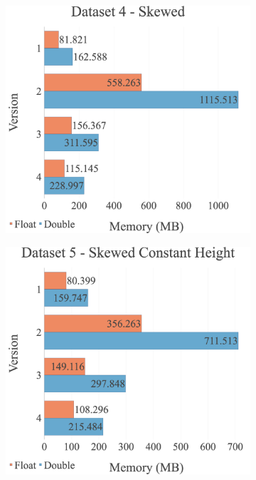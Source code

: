 \begin{figure}[H]
\begin{adjustwidth}{-2cm}{-2cm}
\begin{subfigure}{.62\textwidth}
  \centering
  \includegraphics[width=1\textwidth]{img/experiments/mem-option-versions-4_SKEWED.png}
\end{subfigure}
\begin{subfigure}{.62\textwidth}
  \centering
  \includegraphics[width=1\textwidth]{img/experiments/mem-option-versions-5_SKEWEDCONSTHEIGHT.png}

\end{subfigure}
\end{adjustwidth}
\end{figure}
